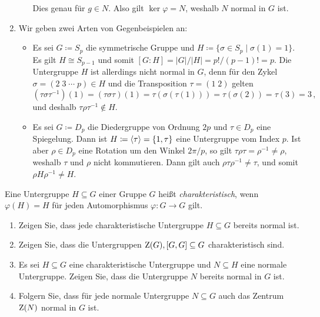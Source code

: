\begin{solution}
\begin{enumerate}
\begin{itemize}
          Dies genau für $g \in N$.
          Also gilt $\ker \varphi = N$, weshalb $N$ normal in $G$ ist.
      \end{itemize}
    \item
      Wir geben zwei Arten von Gegenbeispielen an:
      \begin{itemize}
        \item
          Es sei $G \coloneqq S_p$ die symmetrische Gruppe und $H \coloneqq \{\sigma \in S_p \mid \sigma(1) = 1\}$.
          Es gilt $H \cong S_{p-1}$ und somit $[G : H] = |G|/|H| = p!/(p-1)! = p$.
          Die Untergruppe $H$ ist allerdings nicht normal in $G$, denn für den Zykel $\sigma = (2 \; 3 \; \dotsb \; p) \in H$ und die Transposition $\tau = (1 \; 2)$ gelten
          \[
              (\tau \sigma \tau^{-1})(1)
            = (\tau \sigma \tau)(1)
            = \tau(\sigma(\tau(1)))
            = \tau(\sigma(2))
            = \tau(3)
            = 3 \,,
          \]
          und deshalb $\tau \rho \tau^{-1} \notin H$.
        \item
          Es sei $G \coloneqq D_p$ die Diedergruppe von Ordnung $2p$ und $\tau \in D_p$ eine Spiegelung.
          Dann ist $H \coloneqq \langle\tau\rangle = \{1, \tau\}$ eine Untergruppe vom Index $p$.
          Ist aber $\rho \in D_p$ eine Rotation um den Winkel $2\pi/p$, so gilt $\tau \rho \tau = \rho^{-1} \neq \rho$, weshalb $\tau$ und $\rho$ nicht kommutieren.
          Dann gilt auch $\rho \tau \rho^{-1} \neq \tau$, und somit $\rho H \rho^{-1} \neq H$.
      \end{itemize}
  \end{enumerate}
\end{solution}


\begin{question}[subtitle = Charakteristische Untergruppen]
  Eine Untergruppe $H \subseteq G$ einer Gruppe $G$ heißt \emph{charakteristisch}, wenn $\varphi(H) = H$ für jeden Automorphismus $\varphi \colon G \to G$ gilt.
  \begin{enumerate}
    \item
      Zeigen Sie, dass jede charakteristische Untergruppe $H \subseteq G$ bereits normal ist.
    \item
      Zeigen Sie, dass die Untergruppen $\operatorname{Z}(G), [G,G] \subseteq G$ charakteristisch sind.
    \item
      Es sei $H \subseteq G$ eine charakteristische Untergruppe und $N \subseteq H$ eine normale Untergruppe.
      Zeigen Sie, dass die Untergruppe $N$ bereits normal in $G$ ist.
    \item
      Folgern Sie, dass für jede normale Untergruppe $N \subseteq G$ auch das Zentrum $\operatorname{Z}(N)$ normal in $G$ ist.
  \end{enumerate}
\end{question}


